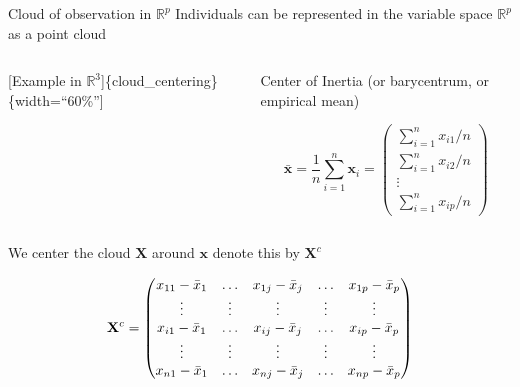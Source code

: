 \documentclass[
  11pt,
  ignorenonframetext,
  notheorems]{beamer}
\newcommand{\Rset}{\mathbb{R}}
\newcommand{\1}{\mathbf{1}}
\newcommand{\bx}{\mathbf{x}}
\newcommand{\bX}{\mathbf{X}}
\theoremstyle{plain}
\theoremstyle{remark}
\begin{document}
\begin{frame}{Cloud of observation in \(\Rset^p\)}
\protect\hypertarget{cloud-of-observation-in-rsetp}{}
Individuals can be represented in the \alert{variable space $\Rset^p$}
as a point cloud

\begin{columns}[T]
\begin{column}{0.45\textwidth}
{[}Example in \(\Rset^3\){]}\{cloud\_centering\}\{width=``60\%''{]}
\end{column}

\begin{column}{0.45\textwidth}
\begin{block}{Center of Inertia}
\protect\hypertarget{center-of-inertia}{}
(or barycentrum, or empirical mean)

\begin{equation*}
\bar{\bx} = \frac{1}{n} \sum _{i=1}^n \bx_i =
      \begin{pmatrix}
        \sum _{i=1}^n x_{i1}/n \\
        \sum _{i=1}^n x_{i2}/n \\
        \vdots\\
        \sum _{i=1}^n x_{ip}/n
      \end{pmatrix}
\end{equation*}
\end{block}
\end{column}
\end{columns}

We center the cloud \(\bX\) around \(\bx\) denote this by \(\bX^c\)

\begin{equation*}
  \bX^c = \begin{pmatrix}
  x_{11} - \bar{x}_1 &   \dots & x_{1j}  - \bar{x}_j & \dots  & x_{1p} - \bar{x}_p   \cr
            \vdots   &  \vdots & \vdots              & \vdots & \vdots  \cr
  x_{i1} - \bar{x}_1 &   \dots & x_{ij} - \bar{x}_j  & \dots  & x_{ip}  - \bar{x}_p \cr
            \vdots   &  \vdots & \vdots              & \vdots & \vdots  \cr
  x_{n1} - \bar{x}_1 &  \dots  & x_{nj} - \bar{x}_j  & \dots  & x_{np}  - \bar{x}_p \cr
  \end{pmatrix}
\end{equation*}
\end{frame}
\end{document}
